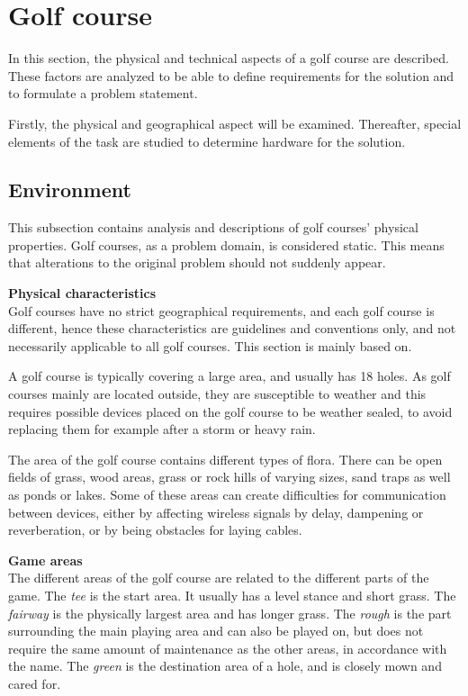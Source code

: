\section{Golf course}
In this section, the physical and technical aspects of a golf course are described. These factors are analyzed to be able to define requirements for the solution and to formulate a problem statement.

Firstly, the physical and geographical aspect will be examined. Thereafter, special elements of the task are studied to determine hardware for the solution. 

\subsection{Environment}
This subsection contains analysis and descriptions of golf courses' physical properties. Golf courses, as a problem domain, is considered static. This means that alterations to the original problem should not suddenly appear.

\textbf{Physical characteristics}\\
Golf courses have no strict geographical requirements, and each golf course is different, hence these characteristics are guidelines and conventions only, and not necessarily applicable to all golf courses. This section is mainly based on\cite{golfCourse}.

A golf course is typically covering a large area, and usually has 18 holes. As golf courses mainly are located outside, they are susceptible to weather and this requires possible devices placed on the golf course to be weather sealed, to avoid replacing them for example after a storm or heavy rain.  %

The area of the golf course contains different types of flora. There can be open fields of grass, wood areas, grass or rock hills of varying sizes, sand traps as well as ponds or lakes. Some of these areas can create difficulties for communication between devices, either by affecting wireless signals by delay, dampening or reverberation, or by being obstacles for laying cables. 

\textbf{Game areas}\\
The different areas of the golf course are related to the different parts of the game. The \textit{tee} is the start area. It usually has a level stance and short grass. The \textit{fairway} is the physically largest area and has longer grass. The \textit{rough} is the part surrounding the main playing area and can also be played on, but does not require the same amount of maintenance as the other areas, in accordance with the name. The \textit{green} is the destination area of a hole, and is closely mown and cared for. 

